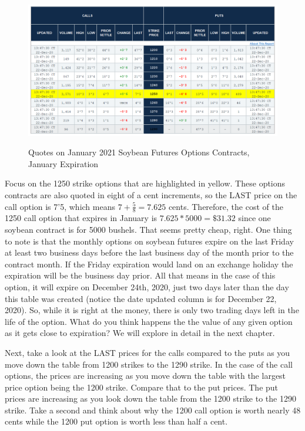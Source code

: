 \documentclass[
  letterpaper,
  DIV=11,
  numbers=noendperiod]{scrreprt}
\begin{document}
\begin{figure}

{\centering 

\href{https://www.cmegroup.com/trading/agricultural/grain-and-oilseed/soybean_contract_specifications.html}{\includegraphics{assets/Options1-quotes.PNG}}

}

\caption{Quotes on January 2021 Soybean Futures Options Contracts,
January Expiration}

\end{figure}

Focus on the 1250 strike options that are highlighted in yellow. These
options contracts are also quoted in eight of a cent increments, so the
LAST price on the call option is 7'5, which means
\(7 + \frac{5}{8} = 7.625\) cents. Therefore, the cost of the 1250 call
option that expires in January is \(7.625*5000 = \$31.32\) since one
soybean contract is for 5000 bushels. That seems pretty cheap, right.
One thing to note is that the monthly options on soybean futures expire
on the last Friday at least two business days before the last business
day of the month prior to the contract month. If the Friday expiration
would land on an exchange holiday the expiration will be the business
day prior. All that means in the case of this option, it will expire on
December 24th, 2020, just two days later than the day this table was
created (notice the date updated column is for December 22, 2020). So,
while it is right at the money, there is only two trading days left in
the life of the option. What do you think happens the the value of any
given option as it gets close to expiration? We will explore in detail
in the next chapter.

Next, take a look at the LAST prices for the calls compared to the puts
as you move down the table from 1200 strikes to the 1290 strike. In the
case of the call options, the prices are increasing as you move down the
table with the largest price option being the 1200 strike. Compare that
to the put prices. The put prices are increasing as you look down the
table from the 1200 strike to the 1290 strike. Take a second and think
about why the 1200 call option is worth nearly 48 cents while the 1200
put option is worth less than half a cent.
\end{document}
